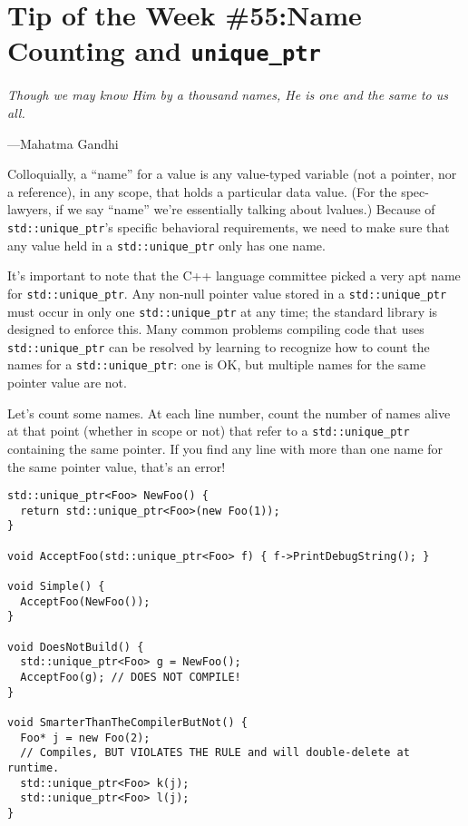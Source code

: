 
\chapter{Tip of the Week \#55:Name Counting and \texorpdfstring{\texttt{unique_ptr}}{}}\label{ch:tip-of-the-week-55}

\epigraph{\itshape Though we may know Him by a thousand names, He is one and the same to us all.}{---Mahatma Gandhi}

Colloquially, a \enquote{name} for a value is any value-typed variable (not a pointer, nor a reference), in any scope, that holds a particular data value. (For the spec-lawyers, if we say \enquote{name} we’re essentially talking about lvalues.) Because of \texttt{std::unique_ptr}’s specific behavioral requirements, we need to make sure that any value held in a \texttt{std::unique_ptr} only has one name.

It’s important to note that the C++ language committee picked a very apt name for \texttt{std::unique_ptr}. Any non-null pointer value stored in a \texttt{std::unique_ptr} must occur in only one \texttt{std::unique_ptr} at any time; the standard library is designed to enforce this. Many common problems compiling code that uses \texttt{std::unique_ptr} can be resolved by learning to recognize how to count the names for a \texttt{std::unique_ptr}: one is OK, but multiple names for the same pointer value are not.

Let’s count some names. At each line number, count the number of names alive at that point (whether in scope or not) that refer to a \texttt{std::unique_ptr} containing the same pointer. If you find any line with more than one name for the same pointer value, that’s an error!

\begin{verbatim}
std::unique_ptr<Foo> NewFoo() {
  return std::unique_ptr<Foo>(new Foo(1));
}

void AcceptFoo(std::unique_ptr<Foo> f) { f->PrintDebugString(); }

void Simple() {
  AcceptFoo(NewFoo());
}

void DoesNotBuild() {
  std::unique_ptr<Foo> g = NewFoo();
  AcceptFoo(g); // DOES NOT COMPILE!
}

void SmarterThanTheCompilerButNot() {
  Foo* j = new Foo(2);
  // Compiles, BUT VIOLATES THE RULE and will double-delete at runtime.
  std::unique_ptr<Foo> k(j);
  std::unique_ptr<Foo> l(j);
}
\end{verbatim}

